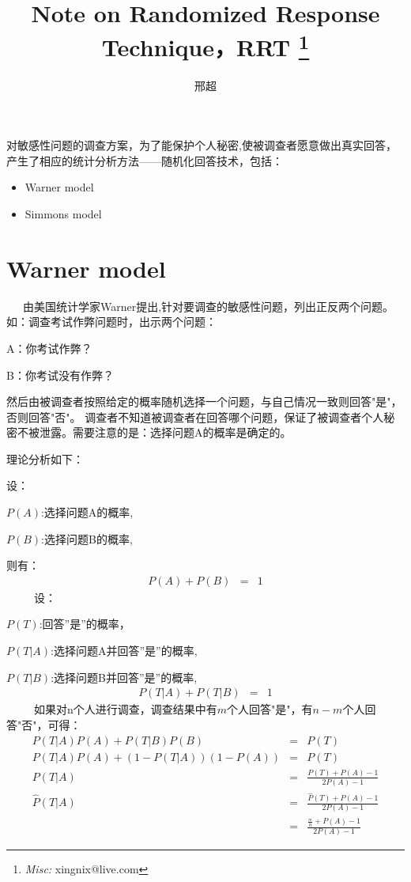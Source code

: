 \documentclass{article}
\newcommand{\tmmisc}[1]{\thanks{\textit{Misc:} #1}}
\newcommand{\tmstrong}[1]{\textbf{#1}}
\begin{document}
\begin{CJK*}{UTF8}{gbsn}

\title{
  {\tmstrong{Note on Randomized Response Technique，RRT}}
  \tmmisc{xingnix@live.com}
}

\author{邢超}

\maketitle

对敏感性问题的调查方案，为了能保护个人秘密,使被调查者愿意做出真实回答，产生了相应的统计分析方法------随机化回答技术，包括：
\begin{itemize}
  \item Warner model
  
  \item Simmons model
  
  
\end{itemize}

\section{Warner model}

\ \ \
由美国统计学家Warner提出,针对要调查的敏感性问题，列出正反两个问题。如：调查考试作弊问题时，出示两个问题：

A：你考试作弊？

B：你考试没有作弊？

然后由被调查者按照给定的概率随机选择一个问题，与自己情况一致则回答"是"，否则回答"否"。
调查者不知道被调查者在回答哪个问题，保证了被调查者个人秘密不被泄露。需要注意的是：选择问题A的概率是确定的。

理论分析如下：

设：

$P ( A )$:选择问题A的概率,

$P ( B )$:选择问题B的概率,

则有：
\begin{eqnarray*}
  P ( A ) +P ( B ) & = & 1
\end{eqnarray*}
\ \ \ \ \ 设：

$P ( T )$:回答''是''的概率，

$P ( T|A )$:选择问题A并回答''是''的概率,

$P ( T|B )$:选择问题B并回答''是''的概率,
\begin{eqnarray*}
  P ( T|A ) +P ( T|B ) & = & 1
\end{eqnarray*}
\ \ \ \ \
如果对n个人进行调查，调查结果中有$m$个人回答"是"，有$n-m$个人回答"否"，可得：
\begin{eqnarray*}
  P ( T|A ) P ( A ) +P ( T|B ) P ( B ) & = & P ( T )\\
  P ( T|A ) P ( A ) + ( 1-P ( T|A ) ) ( 1-P ( A ) ) & = & P ( T )\\
  P ( T|A ) & = & \frac{P ( T ) +P ( A ) -1}{2P ( A ) -1}\\
  \hat{P} ( T|A ) & = & \frac{\hat{P} ( T ) +P ( A ) -1}{2P ( A ) -1}\\
  & = & \frac{\frac{_{m}}{n} +P ( A ) -1}{2P ( A ) -1}
\end{eqnarray*}



\end{CJK*}
\end{document}

